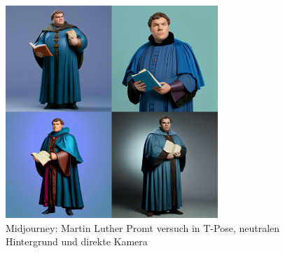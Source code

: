 \documentclass[10pt,a4paper,bibliography=totocnumbered,listof=totocnumbered]{scrartcl}
\begin{document}
\begin{figure}
	\centering
	\includegraphics[width=8.022cm]{BilderFuerBA/MJ/MartinLutherInTPoseFirst.png}
	\caption{Midjourney: Martin Luther Promt versuch in T-Pose, neutralen Hintergrund und direkte Kamera}
	\label{MartinLutherInTPoseNeutralerHintergrundDirekteKamera}
\end{figure}
\end{document}
